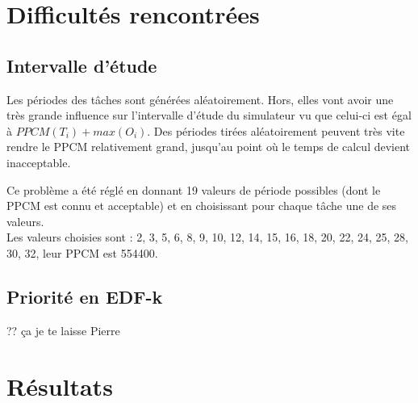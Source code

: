 \documentclass[a4paper,10pt]{article}
\begin{document}
\section{Difficultés rencontrées}
\subsection{Intervalle d'étude}

Les périodes des tâches sont générées aléatoirement. Hors, elles vont avoir une très grande influence sur l'intervalle d'étude du simulateur vu que celui-ci est égal à $PPCM(T_i)+ max(O_i)$. Des périodes tirées aléatoirement peuvent très vite rendre le PPCM relativement grand, jusqu'au point où le temps de calcul devient inacceptable.

Ce problème a été réglé en donnant 19 valeurs de période possibles (dont le PPCM est connu et acceptable) et en choisissant pour chaque tâche une de ses valeurs.\\

Les valeurs choisies sont : {2, 3, 5, 6, 8, 9, 10, 12, 14, 15, 16, 18, 20, 22, 24, 25, 28, 30, 32}, leur PPCM est 554400.

\subsection{Priorité en EDF-k}

?? ça je te laisse Pierre 

\section{Résultats}
\end{document}
